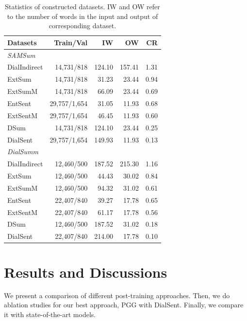 
\begin{table}[t]
	\small
	\centering
	\begin{tabular}{lrrrr}
		\toprule[1pt]
		\textbf{Datasets} & \textbf{Train/Val} & \textbf{IW} & \textbf{OW} & \textbf{CR} \\
		\midrule[1pt]
		\multicolumn{5}{l}{\textit{SAMSum}} \\
		{DialIndirect} & 14,731/818 & 124.10 & 157.41 & 1.31 \\
		{ExtSum} & 14,731/818 & 31.23 & 23.44 &0.94  \\
		{ExtSumM} & 14,731/818 & 66.09 &23.44 & 0.69 \\
		{EntSent} & 29,757/1,654 & 31.05 & 11.93 &0.68  \\
		{ExtSentM} & 29,757/1,654 & 46.45 & 11.93 & 0.60 \\
		{DSum} & 14,731/818 & 124.10 & 23.44 & 0.25 \\
		{DialSent} &29,757/1,654  & 149.93 & 11.93 & 0.13 \\
		\midrule[1pt]
		\multicolumn{5}{l}{\textit{DialSumm}} \\
		{DialIndirect} & 12,460/500 & 187.52 & 215.30 & 1.16 \\
		{ExtSum} & 12,460/500 & 44.43 & 30.02 &0.84 \\
		{ExtSumM} & 12,460/500 & 94.32 &31.02 &0.61  \\
		{EntSent} & 22,407/840 & 39.27 &17.78  &0.65  \\
		{ExtSentM} &22,407/840  &61.17  & 17.78 & 0.56 \\
		{DSum} & 12,460/500 & 187.52 & 31.02 & 0.18 \\
		{DialSent} &22,407/840  &214.00 & 17.78 & 0.10 \\
		\bottomrule[1pt]
	\end{tabular}
	\caption{Statistics of constructed datasets. IW and OW refer to the number of words in the input and output of corresponding dataset.}
	\label{tab:rephrasedatasets}
\end{table}

\section{Results and Discussions}

We present a comparison of different post-training approaches. Then, we do ablation studies for our best approach, PGG with DialSent. Finally, we compare it with state-of-the-art models. %




